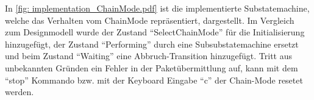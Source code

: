 \documentclass[./\jobname.tex]{subfiles}
\begin{document}
%
\begin{figure}[H]
	\centering
	\noindent{}
	\label{fig: implementation_LocalMode.pdf}
\end{figure}
%
\newpage
In \autoref{fig: implementation_ChainMode.pdf} ist die implementierte Substatemachine, welche das Verhalten vom ChainMode repräsentiert, dargestellt. Im Vergleich zum Designmodell wurde der Zustand \enquote{SelectChainMode} für die Initialisierung hinzugefügt, der Zustand \enquote{Performing} durch eine Subsubstatemachine ersetzt und beim Zustand \enquote{Waiting} eine Abbruch-Transition hinzugefügt. Tritt aus unbekannten Gründen ein Fehler in der Paketübermittlung auf, kann mit dem \enquote{stop} Kommando bzw. mit der Keyboard Eingabe \enquote{c} der Chain-Mode resetet werden.
%
\end{document}
